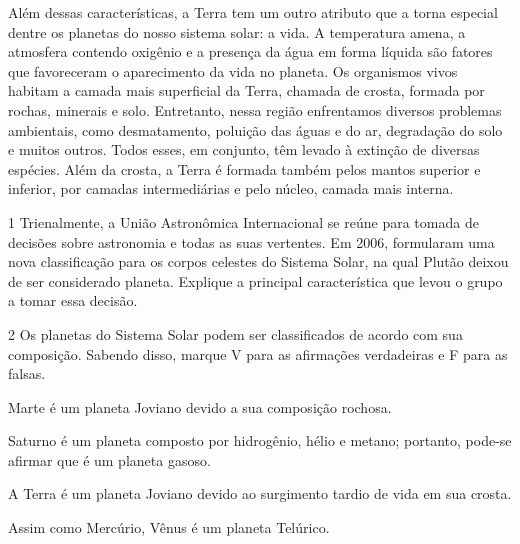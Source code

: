 {Além dessas características, a Terra tem um outro atributo que a torna
especial dentre os planetas do nosso sistema solar: a vida. A
temperatura amena, a atmosfera contendo oxigênio e a presença da água em
forma líquida são fatores que favoreceram o aparecimento da vida no
planeta. Os organismos vivos habitam a camada mais superficial da Terra,
chamada de crosta, formada por rochas, minerais e solo. Entretanto,
nessa região enfrentamos diversos problemas ambientais, como
desmatamento, poluição das águas e do ar, degradação do solo e muitos
outros. Todos esses, em conjunto, têm levado à extinção de diversas
espécies. Além da crosta, a Terra é formada também pelos mantos superior e
inferior, por camadas intermediárias e pelo núcleo, camada mais interna.}


\num{1}  Trienalmente, a União Astronômica Internacional se reúne para tomada
  de decisões sobre astronomia e todas as suas vertentes. Em 2006,
  formularam uma nova classificação para os corpos celestes do Sistema
  Solar, na qual Plutão deixou de ser considerado planeta. Explique a
  principal característica que levou o grupo a tomar essa decisão.



\num{2} Os planetas do Sistema Solar podem ser classificados de acordo com sua
  composição. Sabendo disso, marque V para as afirmações verdadeiras e F para as falsas.

\begin{boxlist}
\item Marte é um planeta Joviano devido a sua composição rochosa. 

\item Saturno é um planeta composto por hidrogênio, hélio e metano;
portanto, pode-se afirmar que é um planeta gasoso. 

\item A Terra é um planeta Joviano devido ao surgimento tardio de vida em
sua crosta. 

\item Assim como Mercúrio, Vênus é um planeta Telúrico. 
\end{boxlist}

